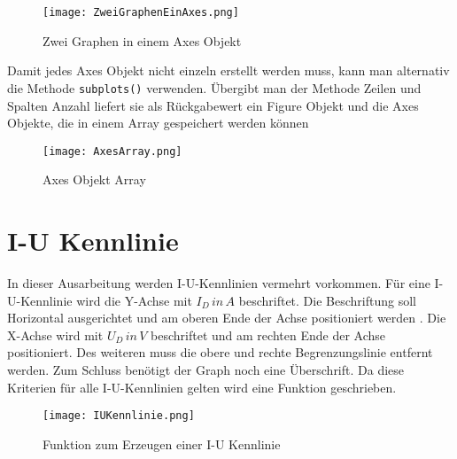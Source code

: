 \begin{figure}[!htb]
\texttt{[image: ZweiGraphenEinAxes.png]}
\caption{Zwei Graphen in einem Axes Objekt}
\label{img:ZweiGraphenEinAxes}
\end{figure}

Damit jedes Axes Objekt nicht einzeln erstellt werden muss, kann man alternativ die Methode \texttt{subplots()} verwenden.
Übergibt man der Methode Zeilen und Spalten Anzahl liefert sie als Rückgabewert ein Figure Objekt und die Axes Objekte, die in einem Array gespeichert werden können

\begin{figure}[!htb]
\texttt{[image: AxesArray.png]}
\caption{Axes Objekt Array}
\label{img:AxesArray}
\end{figure}


\section{I-U Kennlinie} \label{sec: IUKennlinie}

In dieser Ausarbeitung werden I-U-Kennlinien vermehrt vorkommen. Für eine I-U-Kennlinie wird die Y-Achse mit  $I_{D}\, in\, A $  beschriftet. Die Beschriftung soll Horizontal ausgerichtet und am oberen Ende der Achse  positioniert werden . Die X-Achse wird mit $U_{D}\,  in\, V$ beschriftet und am rechten Ende der Achse positioniert. Des weiteren muss die obere und rechte  Begrenzungslinie entfernt werden. Zum Schluss benötigt der Graph noch eine Überschrift. Da diese Kriterien für alle I-U-Kennlinien gelten wird eine Funktion geschrieben. 

\begin{figure}[!htb]
\texttt{[image: IUKennlinie.png]}
\caption{Funktion zum Erzeugen einer I-U Kennlinie}
\label{img:IUKennlinie}
\end{figure}


